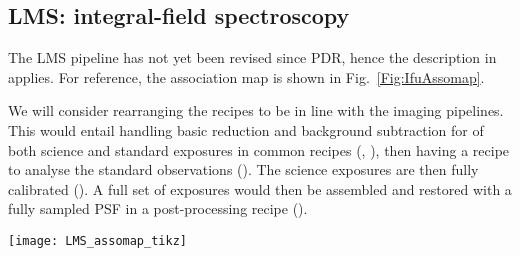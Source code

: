 \subsection{LMS: integral-field spectroscopy}
\label{ssec:overview_lms}

The LMS pipeline has not yet been revised since PDR, hence the
description in \cite{DRLS} applies. For reference, the association map
is shown in Fig.~\ref{Fig:IfuAssomap}.

We will consider rearranging the recipes to be in line with the
imaging pipelines. This would entail handling basic reduction and
background subtraction for of both science and standard exposures in
common recipes (, ),
then having a recipe to analyse the standard observations
(). The science exposures are then fully
calibrated (). A full set of exposures would
then be assembled and restored with a fully sampled PSF in a
post-processing recipe ().

\begin{sidewaysfigure}[ht]
  \centering
  \texttt{[image: LMS\_assomap\_tikz]}
  \caption[Reduction cascade and association map for IFU
  spectroscopy]{%
    Association map for IFU spectroscopy in L- and M-band (LMS). The
    figure shows only the primary products created by each recipe; for
    a full list of products refer to the recipe descriptions in
    Sect.~\ref{ssec:LMS_recipes}. The dashed lines separates
    calibration tasks that are done at AIT or infrequently during
    operations from daily tasks. The prefix ``'' has been
    omitted from the recipe names to improve clarity.}
  \label{Fig:IfuAssomap}
\end{sidewaysfigure}




